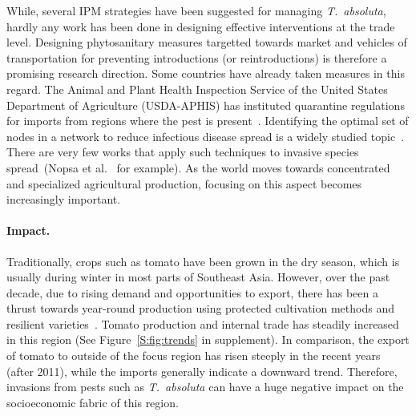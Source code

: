 \documentclass[11pt]{article}
\newcommand{\tuta}{\emph{T.~absoluta}}
\theoremstyle{definition}
\begin{document}
While, several IPM strategies have been suggested for managing \tuta{},
hardly any work has been done in designing effective interventions at the
trade level. Designing phytosanitary measures targetted towards market and
vehicles of transportation for preventing introductions (or
reintroductions) is therefore a promising research direction. Some
countries have already taken measures in this regard. The Animal and Plant
Health Inspection Service of the United States Department of Agriculture
(USDA-APHIS) has instituted quarantine regulations for imports from regions
where the pest is present~\cite{USDA2012}. Identifying the optimal set of
nodes in a network to reduce infectious disease spread is a widely studied
topic~\cite{madar2004immunization}. There are very few works that apply
such techniques to invasive species spread~(Nopsa et
al.~\cite{nopsa2015ecological} for example). As the world moves towards
concentrated and specialized agricultural production, focusing on this
aspect becomes increasingly important.

\paragraph{Impact.} Traditionally, crops such as tomato have been grown in
the dry season, which is usually during winter in most parts of Southeast
Asia. However, over the past decade, due to rising demand and opportunities
to export, there has been a thrust towards year-round production using
protected cultivation methods and resilient varieties~\cite{ali2001}.
Tomato production and internal trade has steadily increased in this region
(See Figure~\ref{S:fig:trends} in supplement). In comparison, the export of
tomato to outside of the focus region has risen steeply in the recent years
(after 2011), while the imports generally indicate a downward trend.
Therefore, invasions from pests such as \tuta{} can have a huge negative
impact on the socioeconomic fabric of this region.  %
\end{document}
